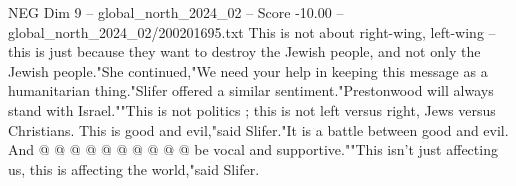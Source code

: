 \begin{textsample}{NEG Dim 9 – global\_north\_2024\_02 – Score -10.00 – global\_north\_2024\_02/200201695.txt}
This is not about right-wing, left-wing -- this is just because they want to destroy the Jewish people, and not only the Jewish people."She continued,"We need your help in keeping this message as a humanitarian thing."Slifer offered a similar sentiment."Prestonwood will always stand with Israel.""This is not politics ; this is not left versus right, Jews versus Christians.
This is good and evil,"said Slifer."It is a battle between good and evil.
And @ @ @ @ @ @ @ @ @ @ be vocal and supportive.""This isn't just affecting us, this is affecting the world,"said Slifer.

\end{textsample}
